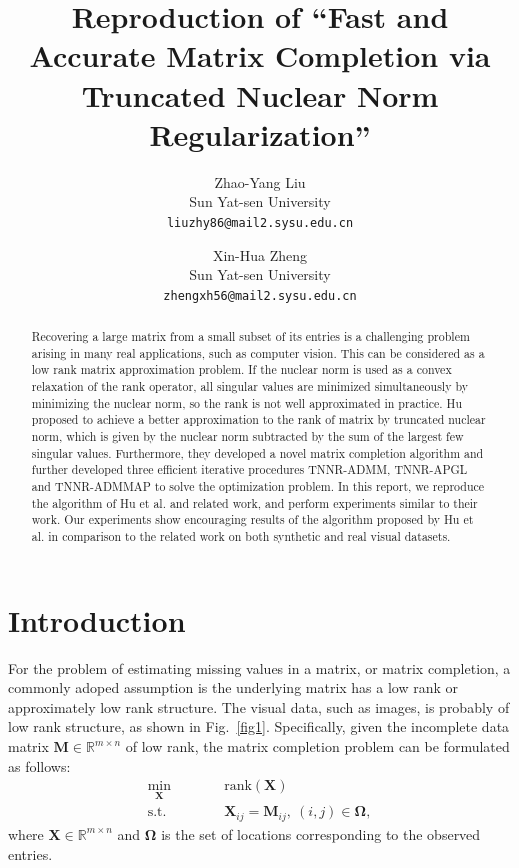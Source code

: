 \documentclass{article}
\title{Reproduction of ``Fast and Accurate Matrix Completion via Truncated Nuclear Norm Regularization''}
\author{%
  Zhao-Yang Liu\\ %
    Sun Yat-sen University \\
  \texttt{liuzhy86@mail2.sysu.edu.cn} \\
  \and
  Xin-Hua Zheng \\
  Sun Yat-sen University \\
  \texttt{zhengxh56@mail2.sysu.edu.cn} \\
}
\begin{document}
{

\maketitle

\begin{abstract}
Recovering a large matrix from a small subset of its entries is a challenging problem arising in many real applications, such as computer vision. This can be considered as a low rank matrix approximation problem. If the nuclear norm is used as a convex relaxation of the rank operator, all singular values are minimized simultaneously by minimizing the nuclear norm, so the rank is not well approximated in practice. 
Hu proposed to achieve a better approximation to the rank of matrix by truncated nuclear norm, which is given by the nuclear norm subtracted by the sum of the largest few singular values. Furthermore, they developed a novel matrix completion algorithm and further developed three efficient iterative procedures TNNR-ADMM, TNNR-APGL and TNNR-ADMMAP to solve the optimization problem.
In this report, we reproduce the algorithm of Hu et al. and related work, and perform experiments similar to their work. Our experiments show encouraging results of the algorithm proposed by Hu et al. in comparison to the related work on both synthetic and real visual datasets.
\end{abstract}


\section{Introduction}
For the problem of estimating missing values in a matrix, or matrix completion, a commonly adoped assumption is the underlying matrix has a low rank or approximately low rank structure.
The visual data, such as images, is probably of low rank structure, as shown in Fig.~\ref{fig1}.
Specifically, given the incomplete data matrix $\mathbf M \in \mathbb{R}^{m \times n}$ of low rank, the matrix completion problem can be formulated as follows:
\begin{equation}
    \begin{aligned}
        \min_{\mathbf X}\qquad&\quad \text{rank}(\mathbf X) \\
        \text{s.t.}\qquad&\quad\mathbf X_{ij} =\mathbf M_{ij}, \ (i,j) \in\mathbf \Omega,
    \end{aligned}
    \label{rmin}
\end{equation}
where $\mathbf X \in \mathbb{R}^{m \times n}$ and $\mathbf \Omega$ is the set of locations corresponding to the observed entries.

}
\end{document}

